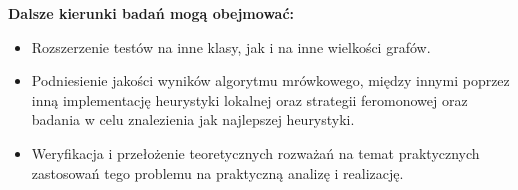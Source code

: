 \textbf{Dalsze kierunki badań mogą obejmować:}
\begin{itemize}
    \item Rozszerzenie testów na inne klasy, jak i na inne wielkości grafów.
    \item Podniesienie jakości wyników algorytmu mrówkowego, między innymi poprzez inną implementację heurystyki lokalnej oraz strategii feromonowej oraz badania w celu znalezienia jak najlepszej heurystyki.
    \item Weryfikacja i przełożenie teoretycznych rozważań na temat praktycznych zastosowań tego problemu na praktyczną analizę i realizację.
\end{itemize}
